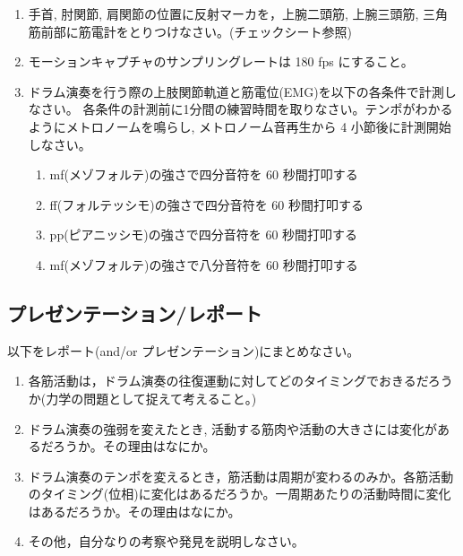 \documentclass{jsarticle}
\begin{document}
\begin{enumerate}
\item 手首, 肘関節, 肩関節の位置に反射マーカを，上腕二頭筋, 上腕三頭筋, 三角筋前部に筋電計をとりつけなさい。(チェックシート参照)
\item モーションキャプチャのサンプリングレートは 180 fps にすること。
\item ドラム演奏を行う際の上肢関節軌道と筋電位(EMG)を以下の各条件で計測しなさい。
      各条件の計測前に1分間の練習時間を取りなさい。テンポがわかるようにメトロノームを鳴らし, メトロノーム音再生から 4 小節後に計測開始しなさい。
  \begin{enumerate}
    \item mf(メゾフォルテ)の強さで四分音符を 60 秒間打叩する %
    \item ff(フォルテッシモ)の強さで四分音符を 60 秒間打叩する %
    \item pp(ピアニッシモ)の強さで四分音符を 60 秒間打叩する %
    \item mf(メゾフォルテ)の強さで八分音符を 60 秒間打叩する %
  \end{enumerate}
\end{enumerate}

\subsection{プレゼンテーション/レポート}

以下をレポート(and/or プレゼンテーション)にまとめなさい。
\begin{enumerate}
  \item 各筋活動は，ドラム演奏の往復運動に対してどのタイミングでおきるだろうか(力学の問題として捉えて考えること。)
  \item ドラム演奏の強弱を変えたとき, 活動する筋肉や活動の大きさには変化があるだろうか。その理由はなにか。
  \item ドラム演奏のテンポを変えるとき，筋活動は周期が変わるのみか。各筋活動のタイミング(位相)に変化はあるだろうか。一周期あたりの活動時間に変化はあるだろうか。その理由はなにか。
  \item その他，自分なりの考察や発見を説明しなさい。
\end{enumerate}
\end{document}
